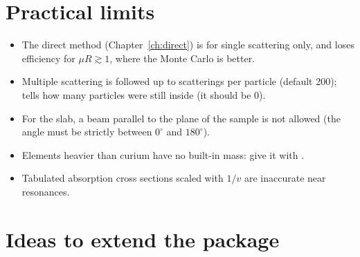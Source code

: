 \section{Practical limits}

\begin{itemize}
  \item The direct method (Chapter~\ref{ch:direct}) is for single scattering only, and loses efficiency for $\mu R\gtrsim1$, where the
        Monte Carlo is better.
  \item Multiple scattering is followed up to  scatterings per particle (default 200);  tells how many particles were
        still inside (it should be 0).
  \item For the slab, a beam parallel to the plane of the sample is not allowed (the angle must be strictly between $0^\circ$ and $180^\circ$).
  \item Elements heavier than curium have no built-in mass: give it with .
  \item Tabulated absorption cross sections scaled with $1/v$ are inaccurate near resonances.
\end{itemize}

\section{Ideas to extend the package}

